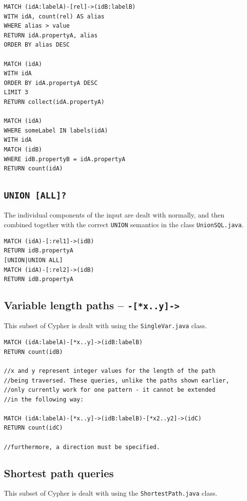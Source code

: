 \documentclass[letterpaper]{ltxdoc}
\begin{document}
\medskip

\begin{lstlisting}[language = Cypher]
MATCH (idA:labelA)-[rel]->(idB:labelB)
WITH idA, count(rel) AS alias
WHERE alias > value
RETURN idA.propertyA, alias
ORDER BY alias DESC

MATCH (idA)
WITH idA
ORDER BY idA.propertyA DESC
LIMIT 3
RETURN collect(idA.propertyA)

MATCH (idA)
WHERE someLabel IN labels(idA)
WITH idA
MATCH (idB)
WHERE idB.propertyB = idA.propertyA
RETURN count(idA)
\end{lstlisting}

\newpage

\subsection*{\texttt{UNION [ALL]?}}
The individual components of the input are dealt with normally, and then combined together with the correct \texttt{UNION} semantics in the class \texttt{UnionSQL.java}.

\medskip

\begin{lstlisting}[language = Cypher]
MATCH (idA)-[:rel1]->(idB)
RETURN idB.propertyA
[UNION|UNION ALL]
MATCH (idA)-[:rel2]->(idB)
RETURN idB.propertyA
\end{lstlisting}

\subsection*{Variable length paths -- \texttt{-[*x..y]->}}
This subset of Cypher is dealt with using the \texttt{SingleVar.java} class.

\medskip

\begin{lstlisting}[language = Cypher]
MATCH (idA:labelA)-[*x..y]->(idB:labelB)
RETURN count(idB)

//x and y represent integer values for the length of the path
//being traversed. These queries, unlike the paths shown earlier,
//only currently work for one pattern - it cannot be extended
//in the following way:

MATCH (idA:labelA)-[*x..y]->(idB:labelB)-[*x2..y2]->(idC)
RETURN count(idC)

//furthermore, a direction must be specified.
\end{lstlisting}

\subsection*{Shortest path queries}
This subset of Cypher is dealt with using the \texttt{ShortestPath.java} class.
\end{document}
